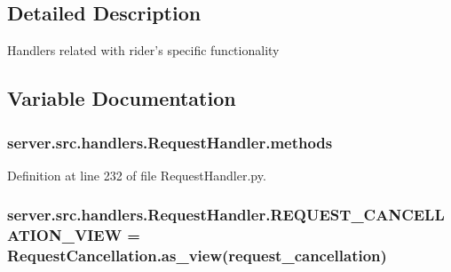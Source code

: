 \subsection{Detailed Description}
\begin{DoxyVerb}Handlers related with rider's specific functionality\end{DoxyVerb}
 

\subsection{Variable Documentation}
\subsubsection[{\texorpdfstring{methods}{methods}}]{\setlength{\rightskip}{0pt plus 5cm}server.\+src.\+handlers.\+Request\+Handler.\+methods}\hypertarget{namespaceserver_1_1src_1_1handlers_1_1_request_handler_aadc72d59d483d61efdb8c69b2e226e3c}{}\label{namespaceserver_1_1src_1_1handlers_1_1_request_handler_aadc72d59d483d61efdb8c69b2e226e3c}


Definition at line 232 of file Request\+Handler.\+py.

\subsubsection[{\texorpdfstring{R\+E\+Q\+U\+E\+S\+T\+\_\+\+C\+A\+N\+C\+E\+L\+L\+A\+T\+I\+O\+N\+\_\+\+V\+I\+EW}{REQUEST_CANCELLATION_VIEW}}]{\setlength{\rightskip}{0pt plus 5cm}server.\+src.\+handlers.\+Request\+Handler.\+R\+E\+Q\+U\+E\+S\+T\+\_\+\+C\+A\+N\+C\+E\+L\+L\+A\+T\+I\+O\+N\+\_\+\+V\+I\+EW = Request\+Cancellation.\+as\+\_\+view(\textquotesingle{}request\+\_\+cancellation\textquotesingle{})}\hypertarget{namespaceserver_1_1src_1_1handlers_1_1_request_handler_a5465e803fcbab51b4b2dd5a0d6041cf2}{}\label{namespaceserver_1_1src_1_1handlers_1_1_request_handler_a5465e803fcbab51b4b2dd5a0d6041cf2}


